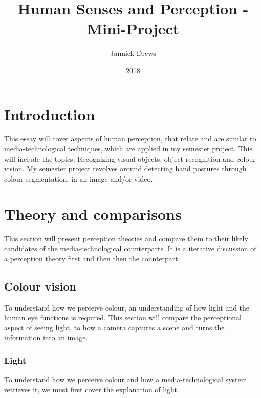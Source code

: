 \documentclass{article}
\title{Human Senses and Perception - Mini-Project}
\author{Jannick Drews}
\date{2018}
\begin{document}
\maketitle
\thispagestyle{empty} %
\newpage %


\section{Introduction}
\label{sec:Introduction}
This essay will cover aspects of human perception, that relate and are similar to media-technological techniques, which are applied in my semester project. This will include the topics; Recognizing visual objects, object recognition and colour vision. My semester project revolves around detecting hand postures through colour segmentation, in an image and/or video.
\section{Theory and comparisons}
\label{sec:Theory}
This section will present perception theories and compare them to their likely candidates of the media-technological counterparts. It is a iterative discussion of a perception theory first and then then the counterpart.

\subsection{Colour vision} %
To understand how we perceive colour, an understanding of how light and the human eye functions is required. This section will compare the perceptional aspect of seeing light, to how a camera captures a scene and turns the information into an image.

\subsubsection{Light}
To understand how we perceive colour and how a media-technological system retrieves it, we must first cover the explanation of light.\medskip\\
\end{document}
